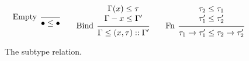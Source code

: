 \documentclass{article}
\theoremstyle{definition}
\newcommand*{\cons}{::}
\begin{document}
\begin{figure}[h!]
  \footnotesize
  \begin{flushright}
    \fbox{$\tau\le\tau$}
  \end{flushright}
  \centering
  \vspace{0pt} %
  \[
    \begin{prooftree}
      \infer[left label=Empty]0{
      \bullet\le\bullet
      }
    \end{prooftree}\qquad
    \begin{prooftree}
      \hypo{
        \begin{matrix}
          \Gamma(x)\le\tau \\
          \Gamma-x\le\Gamma'
        \end{matrix}
      }
      \infer[left label=Bind]1{
      \Gamma\le(x,\tau)\cons\Gamma'
      }
    \end{prooftree}\qquad
    \begin{prooftree}
      \hypo{
        \begin{matrix}
          \tau_2\le\tau_1 \\
          \tau_1'\le\tau_2'
        \end{matrix}
      }
      \infer[left label=Fn]1{
      \tau_1\rightarrow\tau_1'\le
      \tau_2\rightarrow\tau_2'
      }
    \end{prooftree}
  \]
  \caption{The subtype relation.}
  \label{fig:subtyping}
\end{figure}
\end{document}
